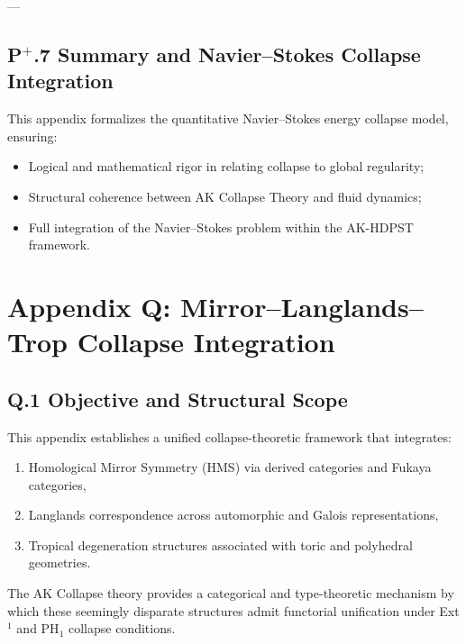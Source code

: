\documentclass[11pt]{article}
\begin{document}
---

\subsection*{P$^{+}$.7 Summary and Navier–Stokes Collapse Integration}

This appendix formalizes the quantitative Navier–Stokes energy collapse model, ensuring:

\begin{itemize}
    \item Logical and mathematical rigor in relating collapse to global regularity;
    \item Structural coherence between AK Collapse Theory and fluid dynamics;
    \item Full integration of the Navier–Stokes problem within the AK-HDPST framework.
\end{itemize}




\section*{Appendix Q: Mirror–Langlands–Trop Collapse Integration}

\subsection*{Q.1 Objective and Structural Scope}

This appendix establishes a unified collapse-theoretic framework that integrates:

\begin{enumerate}
  \item Homological Mirror Symmetry (HMS) via derived categories and Fukaya categories,
  \item Langlands correspondence across automorphic and Galois representations,
  \item Tropical degeneration structures associated with toric and polyhedral geometries.
\end{enumerate}

The AK Collapse theory provides a categorical and type-theoretic mechanism by which these seemingly disparate structures admit functorial unification under Ext$^1$ and PH$_1$ collapse conditions.
\end{document}
